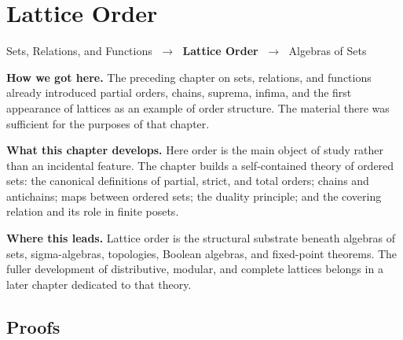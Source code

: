 \chapter{Lattice Order}

\begin{tcolorbox}[
  colback=breadcrumb!8,
  colframe=breadcrumb!50,
  arc=2pt,
  left=8pt, right=8pt, top=6pt, bottom=6pt,
  title={\small\textbf{lattice-order}},
  fonttitle=\small\bfseries
]
\begin{center}
\small
Sets, Relations, and Functions
$\;\to\;$ \textbf{Lattice Order}
$\;\to\;$ Algebras of Sets
\end{center}
\end{tcolorbox}

\begin{tcolorbox}[
  colback=gray!6,
  colframe=gray!40,
  arc=2pt,
  left=8pt, right=8pt, top=6pt, bottom=6pt,
  title={\small\textbf{Structural Roadmap}},
  fonttitle=\small\bfseries
]
\noindent\textbf{How we got here.}
The preceding chapter on sets, relations, and functions already introduced
partial orders, chains, suprema, infima, and the first appearance of
lattices as an example of order structure.  The material there was sufficient
for the purposes of that chapter.

\medskip
\noindent\textbf{What this chapter develops.}
Here order is the main object of study rather than an incidental feature.
The chapter builds a self-contained theory of ordered sets: the canonical
definitions of partial, strict, and total orders; chains and antichains;
maps between ordered sets; the duality principle; and the covering relation
and its role in finite posets.

\medskip
\noindent\textbf{Where this leads.}
Lattice order is the structural substrate beneath algebras of sets,
sigma-algebras, topologies, Boolean algebras, and fixed-point theorems.
The fuller development of distributive, modular, and complete lattices
belongs in a later chapter dedicated to that theory.
\end{tcolorbox}



\section*{Proofs}

